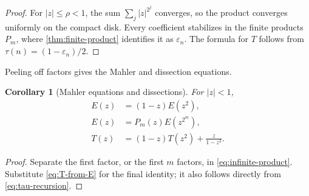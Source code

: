 \documentclass[11pt,oneside]{article}
\numberwithin{equation}{section}
\newtheorem{corollary}[theorem]{Corollary}
\theoremstyle{definition}
\theoremstyle{remark}
\newcommand{\eps}{\varepsilon}
\begin{document}
\begin{proof}
For \(|z|\le\rho<1\), the sum \(\sum_j|z|^{2^j}\) converges, so the product
converges uniformly on the compact disk.  Every coefficient stabilizes in the
finite products \(P_m\), where \cref{thm:finite-product} identifies it as
\(\eps_n\).  The formula for \(T\) follows from
\(\tau(n)=(1-\eps_n)/2\).
\end{proof}

Peeling off factors gives the Mahler and dissection equations.

\begin{corollary}[Mahler equations and dissections]
\label{cor:mahler-equations}
For \(|z|<1\),
\begin{align}
  E(z)&=(1-z)E(z^2),
  \label{eq:E-Mahler}\\
  E(z)&=P_m(z)E(z^{2^m}),
  \label{eq:E-dissection}\\
  T(z)&=(1-z)T(z^2)+\frac{z}{1-z^2}.
  \label{eq:T-Mahler}
\end{align}
\end{corollary}

\begin{proof}
Separate the first factor, or the first \(m\) factors, in
\eqref{eq:infinite-product}.  Substitute \eqref{eq:T-from-E} for the final
identity; it also follows directly from \eqref{eq:tau-recursion}.
\end{proof}
\end{document}
